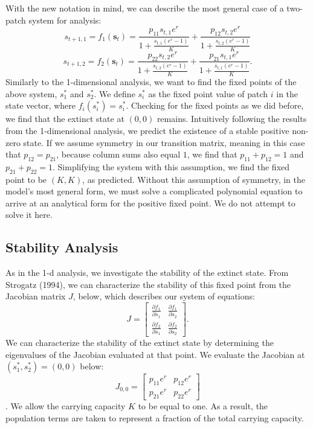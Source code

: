 \documentclass[12pt, openany]{book}
\theoremstyle{definition}
\theoremstyle{remark}
\numberwithin{equation}{chapter}
\numberwithin{figure}{chapter}
\begin{document}
With the new notation in mind, we can describe the most general case of a two-patch system for analysis:
\begin{equation}\label{2d.1}
s_{t+1,1} = f_1(\mathbf{s}_{t}) = \frac{p_{11}s_{t,1}e^r}{1+\frac{s_{t,1}(e^r-1)}{K}} +
\frac{p_{12}s_{t,2}e^r}{1+\frac{s_{t,2}(e^r-1)}{K}}
\end{equation}
\begin{equation}\label{2d.2}
s_{t+1,2} = f_2(\mathbf{s}_{t}) = \frac{p_{22}s_{t,2}e^r}{1+\frac{s_{t,2}(e^r-1)}{K}} +
\frac{p_{21}s_{t,1}e^r}{1+\frac{s_{t,1}(e^r-1)}{K}}.
\end{equation}
Similarly to the 1-dimensional analysis, we want to find the fixed points of the above system, $s_1^*$ and $s_2^*$. We define $s_i^*$ as the fixed point value of patch $i$ in the state vector, where $f_i(s_i^*) = s_i^*$. Checking for the fixed points as we did before, we find that the extinct state at $(0,0)$ remains. Intuitively following the results from the 1-dimensional analysis, we predict the existence of a stable positive non-zero state. If we assume symmetry in our transition matrix, meaning in this case that $p_{12} = p_{21}$, because column sums also equal $1$, we find that $p_{11} + p_{12} = 1$ and $p_{21} + p_{22} = 1$. Simplifying the system with this assumption, we find the fixed point to be $(K, K)$, as predicted. Without this assumption of symmetry, in the model's most general form, we must solve a complicated polynomial equation to arrive at an analytical form for the positive fixed point. We do not attempt to solve it here.

\subsection{Stability Analysis}

As in the 1-d analysis, we investigate the stability of the extinct state. From Strogatz (1994), we can characterize the stability of this fixed point from the Jacobian matrix $J$, below, which describes our system of equations:
\[
J = 
\begin{bmatrix} 
\frac{\partial f_1}{\partial s_1} & \frac{\partial f_1}{\partial s_2} \\
\frac{\partial f_2}{\partial s_1} & \frac{\partial f_2}{\partial s_2}
\end{bmatrix}.
\]
We can characterize the stability of the extinct state by determining the eigenvalues of the Jacobian evaluated at that point. We evaluate the Jacobian at $(s_1^*,s_2^*) = (0,0)$ below:
\[
J_{0,0} = 
\begin{bmatrix} 
p_{11}e^r & p_{12}e^r \\
p_{21}e^r & p_{22}e^r
\end{bmatrix}
\].
We allow the carrying capacity $K$ to be equal to one. As a result, the population terms are taken to represent a fraction of the total carrying capacity.
\\
\end{document}

